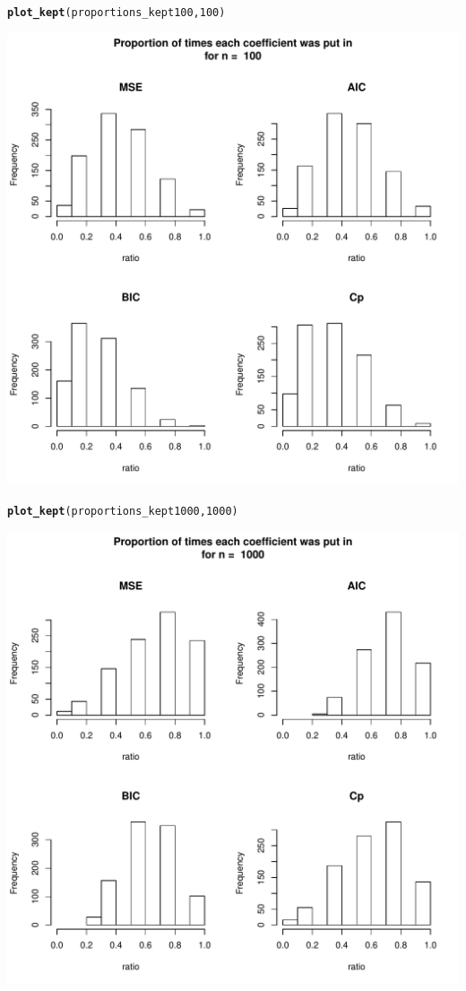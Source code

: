 \documentclass[11pt]{article}\usepackage[]{graphicx}\usepackage[]{color}
\makeatletter
\def\maxwidth{ %
  \ifdim\Gin@nat@width>\linewidth
    \linewidth
  \else
    \Gin@nat@width
  \fi
}
\newcommand{\hlnum}[1]{\textcolor[rgb]{0.686,0.059,0.569}{#1}}%
\newcommand{\hlstd}[1]{\textcolor[rgb]{0.345,0.345,0.345}{#1}}%
\newcommand{\hlkwd}[1]{\textcolor[rgb]{0.737,0.353,0.396}{\textbf{#1}}}%
\newenvironment{kframe}{%
 \def\at@end@of@kframe{}%
 \ifinner\ifhmode%
  \def\at@end@of@kframe{\end{minipage}}%
  \begin{minipage}{\columnwidth}%
 \fi\fi%
 \def\FrameCommand##1{\hskip\@totalleftmargin \hskip-\fboxsep
 \colorbox{shadecolor}{##1}\hskip-\fboxsep
     \hskip-\linewidth \hskip-\@totalleftmargin \hskip\columnwidth}%
 \MakeFramed {\advance\hsize-\width
   \@totalleftmargin\z@ \linewidth\hsize
   \@setminipage}}%
 {\par\unskip\endMakeFramed%
 \at@end@of@kframe}
\newenvironment{knitrout}{}{} %
\makeatother
\begin{document}
\begin{knitrout}
\begin{kframe}
\begin{alltt}
\hlkwd{plot_kept}\hlstd{(proportions_kept100,}\hlnum{100}\hlstd{)}
\end{alltt}
\end{kframe}
\includegraphics[width=\maxwidth]{figure/unnamed-chunk-6-1} 
\begin{kframe}\begin{alltt}
\hlkwd{plot_kept}\hlstd{(proportions_kept1000,}\hlnum{1000}\hlstd{)}
\end{alltt}
\end{kframe}
\includegraphics[width=\maxwidth]{figure/unnamed-chunk-6-2} 

\end{knitrout}
\end{document}
